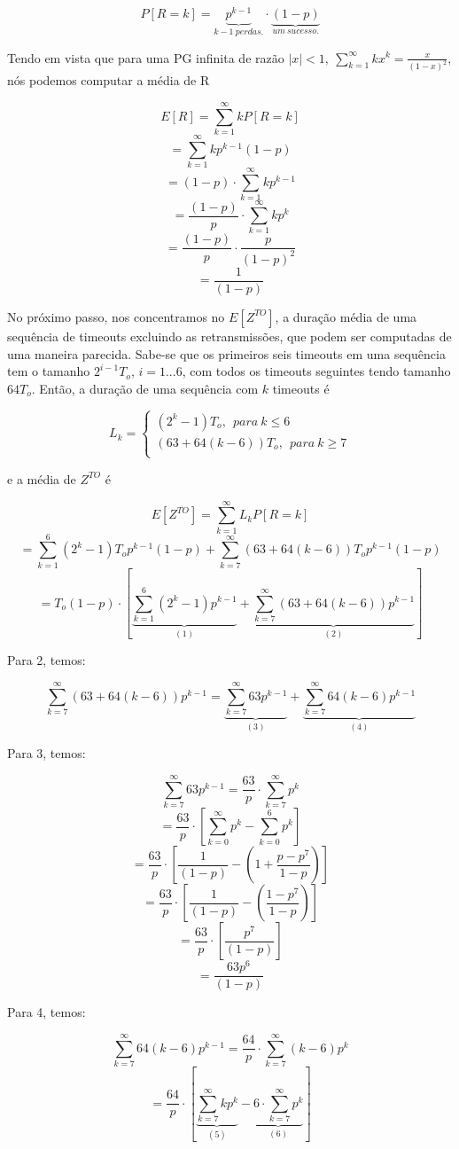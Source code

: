 $$P[R = k] = \underbrace{p^{k-1}}_{k-1 \ perdas.} \cdot \underbrace{(1-p)}_{um \ sucesso.} $$

Tendo em vista que para uma PG infinita de razão $|x|<1, \ \sum_{k=1}^{\infty}kx^k = \frac{x}{(1-x)^2} $, nós podemos computar a média de R

$$E[R] = \sum_{k=1}^{\infty}kP[R=k]$$
$$= \sum_{k=1}^{\infty}kp^{k-1}(1-p)$$
$$= (1-p)\cdot \sum_{k=1}^{\infty}kp^{k-1}$$
$$= \frac{(1-p)}{p}\cdot \sum_{k=1}^{\infty}kp^{k}$$
$$= \frac{(1-p)}{p}\cdot \frac{p}{(1-p)^2}$$
$$= \frac{1}{(1-p)}$$

No próximo passo, nos concentramos no $E[Z^{TO}]$, a duração média de uma sequência de timeouts excluindo as retransmissões, que podem ser computadas de uma maneira parecida. Sabe-se que os primeiros seis timeouts em uma sequência tem o tamanho $2^{i-1}T_o$, $i = 1...6$, com todos os timeouts seguintes tendo tamanho $64T_o$. Então, a duração de uma sequência com $k$ timeouts é

$$L_k = \begin{cases} 
  (2^k - 1)T_o,  \ \  para \  k \leq 6 \\
  (63 + 64(k-6))T_o,  \ \ para  \ k \geq 7\\
\end{cases} $$

e a média de $Z^{TO}$ é

$$E[Z^{TO}] = \sum_{k=1}^{\infty}L_kP[R=k] $$
$$=  \sum_{k=1}^{6}(2^k -1)T_op^{k-1}(1-p) + \sum_{k=7}^{\infty}(63+64(k-6))T_op^{k-1}(1-p)$$
$$=  T_o(1-p) \cdot [\underbrace{\sum_{k=1}^{6}(2^k -1)p^{k-1}}_{(1)} + \underbrace{\sum_{k=7}^{\infty}(63+64(k-6))p^{k-1}}_{(2)}] $$

Para 2, temos:

$$\sum_{k=7}^{\infty}(63+64(k-6))p^{k-1} = \underbrace{\sum_{k=7}^{\infty}63p^{k-1}}_{(3)} + \underbrace{\sum_{k=7}^{\infty}64(k-6)p^{k-1}}_{(4)} $$

Para 3, temos:

$$\sum_{k=7}^{\infty}63p^{k-1} = \frac{63}{p}\cdot \sum_{k=7}^{\infty}p^{k} $$
$$ = \frac{63}{p}\cdot [\sum_{k=0}^{\infty}p^{k} - \sum_{k=0}^{6}p^{k}] $$
$$ = \frac{63}{p}\cdot [\frac{1}{(1-p)} - (1 + \frac{p - p^7}{1-p})] $$
$$ = \frac{63}{p}\cdot [\frac{1}{(1-p)} - (\frac{1 - p^7}{1-p})] $$
$$ = \frac{63}{p}\cdot [\frac{p^7}{(1-p)}] $$
$$ = \frac{63p^6}{(1-p)} $$

Para 4, temos:

$$\sum_{k=7}^{\infty}64(k-6)p^{k-1} =  \frac{64}{p} \cdot \sum_{k=7}^{\infty}(k-6)p^{k}$$
$$ =  \frac{64}{p} \cdot [\underbrace{\sum_{k=7}^{\infty}kp^{k}}_{(5)} - \underbrace{6 \cdot \sum_{k=7}^{\infty}p^{k}}_{(6)}]  $$

